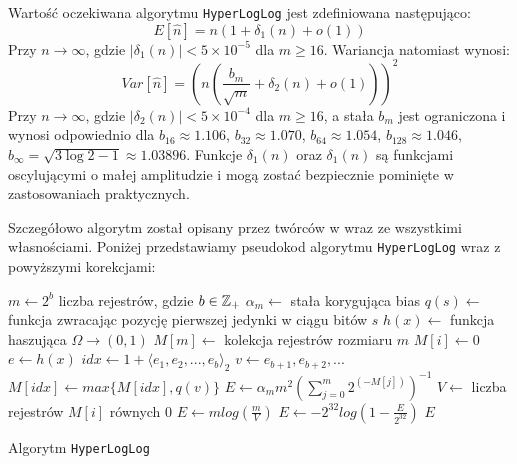 Wartość oczekiwana algorytmu \texttt{HyperLogLog} jest zdefiniowana następująco:
\begin{equation}
    E[\hat{n}] = n(1 + {\delta}_1(n) + o(1))
\end{equation}
Przy $n \rightarrow \infty$, gdzie $|{\delta}_1(n)| < 5 \times 10^{-5}$ dla $m \geq 16$.
Wariancja natomiast wynosi:
\begin{equation}
    Var[\hat{n}] = (n(\frac{{b}_m}{\sqrt{m}} + {\delta}_2(n) + o(1)))^2
\end{equation}
Przy $n \rightarrow \infty$, gdzie $|{\delta}_2(n)| < 5 \times 10^{-4}$ dla $m \geq 16$, a stała ${b}_m$ jest ograniczona i wynosi odpowiednio dla ${b}_{16} \approx 1.106$, ${b}_{32} \approx 1.070$, ${b}_{64} \approx 1.054$, ${b}_{128} \approx 1.046$, ${b}_{\infty} = \sqrt{3\log{2} - 1} \approx 1.03896$. Funkcje ${\delta}_1(n)$ oraz ${\delta}_1(n)$ są funkcjami oscylującymi o małej amplitudzie i mogą zostać bezpiecznie pominięte w zastosowaniach praktycznych.

Szczegółowo algorytm został opisany przez twórców w \cite{hll} wraz ze wszystkimi własnościami. Poniżej przedstawiamy pseudokod algorytmu \texttt{HyperLogLog} wraz z powyższymi korekcjami:
\newline
\begin{algorithm}
    \begin{algorithmic}
    \State $m \gets 2^b$ liczba rejestrów, gdzie $b \in {\mathbb{Z}}_{+}$
    \State ${\alpha}_m \gets$ stała korygująca bias
    \State $q(s) \gets $ funkcja zwracając pozycję pierwszej jedynki w ciągu bitów $s$
    \State $h(x) \gets $ funkcja haszująca $\Omega \rightarrow (0, 1)$
    \State $M[m] \gets $ kolekcja rejestrów rozmiaru $m$
    \newline
        \State $M[i] \gets 0$
    \EndFor
    \newline
        \State $e \gets h(x)$
        \State $idx \gets 1 + {{\langle}e_1, e_2, ..., e_b{\rangle}}_2$
        \State $v \gets e_{b+1}, e_{b+2}, ...$
        \State $M[idx] \gets max\{M[idx], q(v)\}$
    \EndFunction
    \newline
        \State $E \gets {\alpha}_{m}{m}^2(\sum_{j=0}^{m} 2^{(-M[j])})^{-1}$
            \State $V \gets $ liczba rejestrów $M[i]$ równych $0$
                \State $E \gets {m}log(\frac{m}{V})$
            \EndIf
            \State $E \gets -2^{32}log(1 - \frac{E}{2^{32}})$
        \EndIf
        \State \Return $E$
    \EndFunction
    
    \end{algorithmic}
    \caption{Algorytm \texttt{HyperLogLog}}
\end{algorithm}

